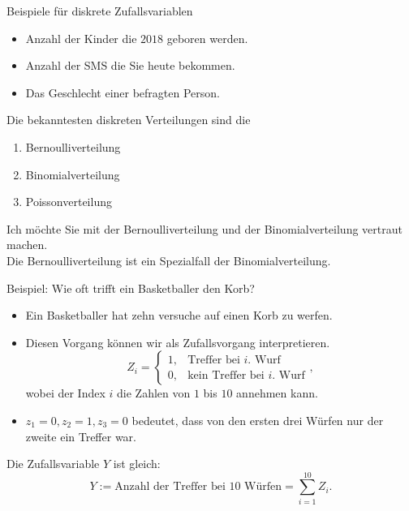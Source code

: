 \documentclass[usenames,dvipsnames,handout]{beamer}
\begin{document}
\begin{frame}{Beispiele für diskrete Zufallsvariablen} 
\begin{itemize}
\item{Anzahl der Kinder die $2018$ geboren werden.}\pause
\item{Anzahl der SMS die Sie heute bekommen.}\pause
\item{Das Geschlecht einer befragten Person.}
\end{itemize}
Die bekanntesten diskreten Verteilungen sind die\pause
\begin{enumerate}
\item{Bernoulliverteilung}\pause
\item{Binomialverteilung}\pause
\item{Poissonverteilung}\pause
\end{enumerate}
Ich möchte Sie mit der Bernoulliverteilung und der Binomialverteilung vertraut machen.\\
Die Bernoulliverteilung ist ein Spezialfall der Binomialverteilung.
\end{frame}

%

\begin{frame}{Beispiel: Wie oft trifft ein Basketballer den Korb?}
\begin{itemize}
\item{Ein Basketballer hat zehn versuche auf einen Korb zu werfen.}
\item{Diesen Vorgang können wir als  Zufallsvorgang  interpretieren.
  \[
     Z_{i}=\left\{\begin{array}{ll} 1, & \text{Treffer bei $i.$ Wurf } \\
         0, &  \text{kein Treffer bei $i.$ Wurf}\end{array}\right.,
  \]
  wobei der Index $i$ die Zahlen von $1$ bis $10$ annehmen kann.
}
\item{$z_{1}=0,z_{2}=1,z_{3}=0$ bedeutet, dass von den ersten drei Würfen nur der zweite ein Treffer war.}
\end{itemize}
Die Zufallsvariable $Y$ ist gleich:
\begin{equation*}
Y := \text{Anzahl der Treffer bei $10$ Würfen}=\sum_{i=1}^{10} Z_{i}.
\end{equation*}
\end{frame}
\end{document}
